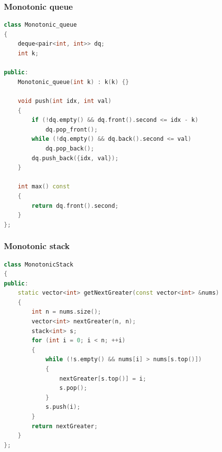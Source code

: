 \documentclass[10pt,landscape,a4paper,twocolumn]{article}
\begin{document}
\subsubsection{Monotonic queue}
\begin{lstlisting}[language=C++]
class Monotonic_queue
{
    deque<pair<int, int>> dq;
    int k;

public:
    Monotonic_queue(int k) : k(k) {}

    void push(int idx, int val)
    {
        if (!dq.empty() && dq.front().second <= idx - k)
            dq.pop_front();
        while (!dq.empty() && dq.back().second <= val)
            dq.pop_back();
        dq.push_back({idx, val});
    }

    int max() const
    {
        return dq.front().second;
    }
};
\end{lstlisting}
\subsubsection{Monotonic stack}
\begin{lstlisting}[language=C++]
class MonotonicStack
{
public:
    static vector<int> getNextGreater(const vector<int> &nums)
    {
        int n = nums.size();
        vector<int> nextGreater(n, n);
        stack<int> s;
        for (int i = 0; i < n; ++i)
        {
            while (!s.empty() && nums[i] > nums[s.top()])
            {
                nextGreater[s.top()] = i;
                s.pop();
            }
            s.push(i);
        }
        return nextGreater;
    }
};
\end{lstlisting}
\end{document}
